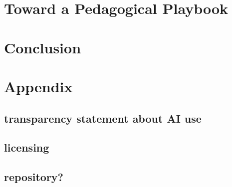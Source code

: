 \documentclass{article}
\begin{document}
\section{Toward a Pedagogical Playbook}



\section{Conclusion}







\newpage
\printbibliography

\section*{Appendix}
\subsection*{transparency statement about AI use}
\subsection*{licensing}
\subsection*{repository?}
\end{document}
